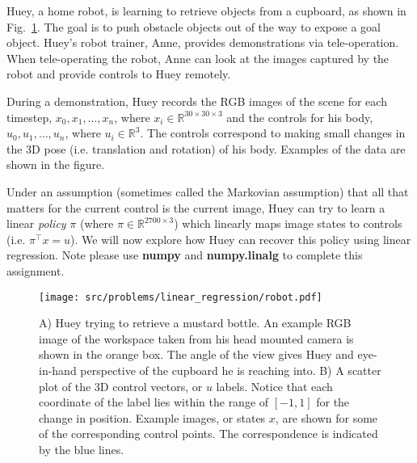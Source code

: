 \documentclass[preview]{standalone}
\begin{document}

Huey, a home robot, is learning to retrieve objects from a cupboard, as shown in Fig.~\ref{fig:robot}. The goal is to push obstacle objects out of the way to expose a goal object.  Huey's robot trainer, Anne, provides demonstrations via tele-operation. When tele-operating the robot, Anne can look at the images captured by the robot and provide controls to Huey remotely.

During a demonstration, Huey records the RGB images of the scene for each timestep, $x_0,x_1,...,x_{n}$, where $x_i \in \mathbb{R}^{30\times 30\times 3}$ and the controls for his body, $u_0,u_1,\ldots,u_{n}$, where $u_i \in \mathbb{R}^3$. The controls correspond to making small changes in the 3D pose (i.e. translation and rotation) of his body. Examples of the data are shown in the figure. 

Under an assumption (sometimes called the Markovian assumption) that all that matters for the current control is the current image, Huey can try to learn a linear \emph{policy} $\pi$ (where $\pi \in \mathbb{R}^{2700\times 3}$) which linearly maps image states to controls (i.e. $\pi^\top x =u$). We will now explore how Huey can recover this policy using linear regression. Note please use {\bf numpy} and {\bf numpy.linalg} to complete this assignment. 

\begin{figure}[h!]
    \begin{center}
    \texttt{[image: src/problems/linear\_regression/robot.pdf]}
    \caption{A) Huey trying to retrieve a mustard bottle. An example RGB image of the workspace taken from his head mounted camera is shown in the orange box. The angle of the view gives Huey and eye-in-hand perspective of the cupboard he is reaching into. B) A scatter plot of the 3D control vectors, or $u$ labels. Notice that each coordinate of the label lies within the range of $[-1,1]$ for the change in position. Example images, or states $x$, are shown for some of the corresponding control points. The correspondence is indicated by the blue lines.  } \label{fig:robot}
    \end{center}
\end{figure}
\end{document}
